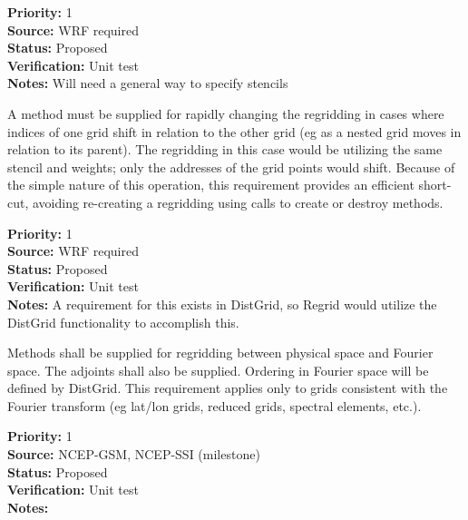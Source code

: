 \begin{reqlist}
{\bf Priority:} 1 \\
{\bf Source:}  WRF required \\
{\bf Status:} Proposed \\
{\bf Verification:} Unit test \\
{\bf Notes:} Will need a general way to specify stencils
\end{reqlist}


A method must be supplied for rapidly changing the
regridding in cases where indices of one grid shift in relation 
to the other grid (eg as a nested grid moves in relation to its 
parent).  The regridding in this case would be utilizing the
same stencil and weights; only the addresses of the grid points
would shift.  Because of the simple nature of this operation,
this requirement provides an efficient short-cut, avoiding
re-creating a regridding using calls to create or destroy methods.

\begin{reqlist}
{\bf Priority:} 1 \\
{\bf Source:}  WRF required \\
{\bf Status:} Proposed \\
{\bf Verification:} Unit test \\
{\bf Notes:} A requirement for this exists in DistGrid, so
             Regrid would utilize the DistGrid functionality to 
             accomplish this.
\end{reqlist}


Methods shall be supplied for regridding between physical space and
Fourier space.  The adjoints shall also be supplied.  Ordering in
Fourier space will be defined by DistGrid.  This requirement applies only
to grids consistent with the Fourier transform (eg lat/lon grids,
reduced grids, spectral elements, etc.).

\begin{reqlist}
{\bf Priority:} 1 \\
{\bf Source:}  NCEP-GSM, NCEP-SSI (milestone) \\
{\bf Status:} Proposed \\
{\bf Verification:} Unit test \\
{\bf Notes:} 
\end{reqlist}

